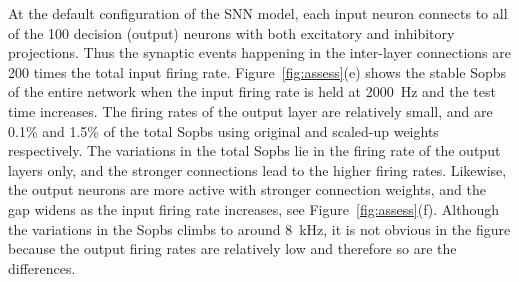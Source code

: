 At the default configuration of the SNN model, each input neuron connects to all of the 100 decision (output) neurons with both excitatory and inhibitory projections.
Thus the synaptic events happening in the inter-layer connections are 200 times the total input firing rate.
Figure~\ref{fig:assess}(e) shows the stable Sopbs of the entire network when the input firing rate is held at 2000~Hz and the test time increases.
The firing rates of the output layer are relatively small, and are 0.1\% and 1.5\% of the total Sopbs using original and scaled-up weights respectively.
The variations in the total Sopbs lie in the firing rate of the output layers only, and the stronger connections lead to the higher firing rates.
Likewise, the output neurons are more active with stronger connection weights, and the gap widens as the input firing rate increases, see Figure~\ref{fig:assess}(f).
Although the variations in the Sopbs climbs to around 8~kHz, it is not obvious in the figure because the output firing rates are relatively low and therefore so are the differences.


